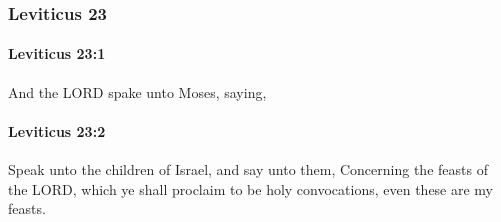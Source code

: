 	\subsubsection{Leviticus 23} %
		\label{LEVITICUS-23}

		\paragraph{Leviticus 23:1} %
			\label{LEVITICUS-23-1}

			And the LORD spake unto Moses, saying,


		\paragraph{Leviticus 23:2} %
			\label{LEVITICUS-23-2}

			Speak unto the children of Israel, and say unto them, Concerning the feasts of the LORD, which ye shall proclaim to be holy convocations, even these are my feasts.

